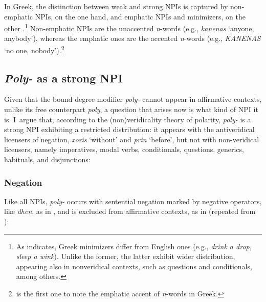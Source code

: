 \documentclass[output=paper]{langscibook}
\begin{document}
\noindent In Greek, the distinction between weak and strong NPIs is captured by non-emphatic NPIs, on the one hand, and emphatic NPIs and minimizers, on the other \citep{giannaki1997dissert,giannaki1998}.\footnote{As \citet{giannaki1997dissert,giannaki1998} indicates, Greek minimizers differ from English ones (e.g., \textit{drink a drop, sleep a wink}). Unlike the former, the latter exhibit wider distribution, appearing also in nonveridical contexts, such as questions and conditionals, among others.} Non-emphatic NPIs are the unaccented \textit{n}-words (e.g., \textit{kanenas} `anyone, anybody'), whereas the emphatic ones are the accented \textit{n}-words (e.g., \textit{KANENAS} `no one, nobody').\footnote{\citet{velou19834} is the first one to note the emphatic accent of \textit{n}-words in Greek.}

\subsection{\textit{Poly-} as a strong NPI} \label{gia:sub:strongpoly-}

Given that the bound degree modifier \textit{poly-} cannot appear in affirmative contexts, unlike its free counterpart \textit{poly}, a question that arises now is what kind of NPI it is. I~argue that, according to the (non)veridicality theory of polarity, \textit{poly-} is a strong NPI exhibiting a restricted distribution: it appears with the antiveridical licensers of negation, \textit{xoris} ‘without’ and \textit{prin} `before', but not with non-veridical licensers, namely imperatives, modal verbs, conditionals, questions, generics, habituals, and disjunctions:

\subsubsection{Negation}

\noindent Like all NPIs, \textit{poly-} occurs with sentential negation marked by negative operators, like \textit{dhen}, as in , and is excluded from affirmative contexts, as in  (repeated from ):

\begin{exe}
\ex\label{gia:ex8} \begin{xlist}
        \label{gia:ex8b}
    \end{xlist}
\end{exe}
\end{document}

